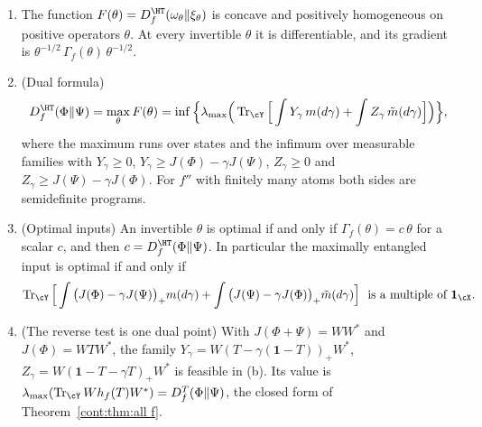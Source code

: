 \begin{theorem}\label{shA:thm:oneshot}
\begin{enumerate}[label=(\alph*)]
\item The function $F(\theta)=D^\HT_f(\omega_\theta\|\xi_\theta)$ is concave and positively homogeneous on positive operators $\theta$. At every invertible $\theta$ it is differentiable, and its gradient is $\theta^{-1/2}\,\Gamma_f(\theta)\,\theta^{-1/2}$.
\item (Dual formula)
\[
D^\HT_f(\Phi\|\Psi)=\max_{\theta}F(\theta)=\inf\Big\{\lambda_{\max}\Big(\Tr_\cY\Big[\int Y_\gamma\,m(d\gamma)+\int Z_\gamma\,\tilde m(d\gamma)\Big]\Big)\Big\},
\]
where the maximum runs over states and the infimum over measurable families with $Y_\gamma\ge0$, $Y_\gamma\ge J(\Phi)-\gamma J(\Psi)$, $Z_\gamma\ge0$ and $Z_\gamma\ge J(\Psi)-\gamma J(\Phi)$. For $f''$ with finitely many atoms both sides are semidefinite programs.
\item (Optimal inputs) An invertible $\theta$ is optimal if and only if $\Gamma_f(\theta)=c\,\theta$ for a scalar $c$, and then $c=D^\HT_f(\Phi\|\Psi)$. In particular the maximally entangled input is optimal if and only if
\[
\Tr_\cY\Big[\int\big(J(\Phi)-\gamma J(\Psi)\big)_+m(d\gamma)+\int\big(J(\Psi)-\gamma J(\Phi)\big)_+\tilde m(d\gamma)\Big]\ \text{ is a multiple of }\mathbf 1_\cX .
\]
\item (The reverse test is one dual point) With $J(\Phi+\Psi)=WW^*$ and $J(\Phi)=WTW^*$, the family $Y_\gamma=W(T-\gamma(\mathbf 1-T))_+W^*$, $Z_\gamma=W(\mathbf 1-T-\gamma T)_+W^*$ is feasible in (b). Its value is $\lambda_{\max}(\Tr_\cY Wh_f(T)W^*)=D^T_f(\Phi\|\Psi)$, the closed form of Theorem~\ref{cont:thm:all f}.
\end{enumerate}
\end{theorem}

